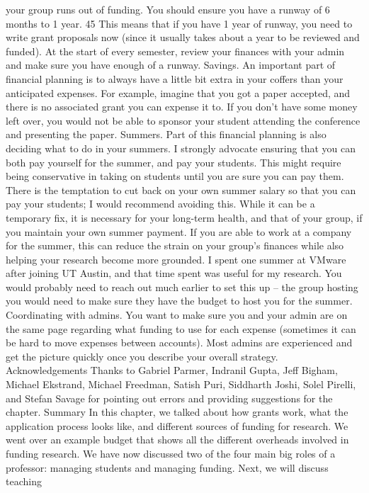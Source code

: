 \documentclass[oneside,11pt]{memoir}
\begin{document}
your group runs out of funding. You should ensure you have a runway of 6 months to 1 year.
45
This means that if you have 1 year of runway, you need to write grant proposals now (since it
usually takes about a year to be reviewed and funded). At the start of every semester, review
your finances with your admin and make sure you have enough of a runway.
Savings. An important part of financial planning is to always have a little bit extra in your coffers
than your anticipated expenses. For example, imagine that you got a paper accepted, and there
is no associated grant you can expense it to. If you don’t have some money left over, you would
not be able to sponsor your student attending the conference and presenting the paper.
Summers. Part of this financial planning is also deciding what to do in your summers. I strongly
advocate ensuring that you can both pay yourself for the summer, and pay your students. This
might require being conservative in taking on students until you are sure you can pay them.
There is the temptation to cut back on your own summer salary so that you can pay your
students; I would recommend avoiding this. While it can be a temporary fix, it is necessary for
your long-term health, and that of your group, if you maintain your own summer payment.
If you are able to work at a company for the summer, this can reduce the strain on your group’s
finances while also helping your research become more grounded. I spent one summer at
VMware after joining UT Austin, and that time spent was useful for my research. You would
probably need to reach out much earlier to set this up – the group hosting you would need to
make sure they have the budget to host you for the summer.
Coordinating with admins. You want to make sure you and your admin are on the same page
regarding what funding to use for each expense (sometimes it can be hard to move expenses
between accounts). Most admins are experienced and get the picture quickly once you describe
your overall strategy.
Acknowledgements
Thanks to Gabriel Parmer, Indranil Gupta, Jeff Bigham, Michael Ekstrand, Michael Freedman,
Satish Puri, Siddharth Joshi, Solel Pirelli, and Stefan Savage for pointing out errors and providing
suggestions for the chapter.
Summary
In this chapter, we talked about how grants work, what the application process looks like, and
different sources of funding for research. We went over an example budget that shows all the
different overheads involved in funding research.
We have now discussed two of the four main big roles of a professor: managing students and
managing funding. Next, we will discuss teaching
\end{document}

